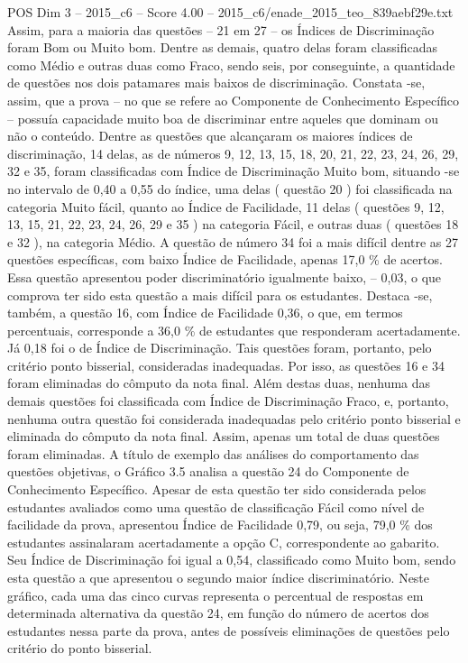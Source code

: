\begin{textsample}{POS Dim 3 – 2015\_c6 – Score 4.00 – 2015\_c6/enade\_2015\_teo\_839aebf29e.txt}
Assim, para a maioria das questões – 21 em 27 – os Índices de Discriminação foram Bom ou Muito bom.
Dentre as demais, quatro delas foram classificadas como Médio e outras duas como Fraco, sendo seis, por conseguinte, a quantidade de questões nos dois patamares mais baixos de discriminação.
Constata -se, assim, que a prova – no que se refere ao Componente de Conhecimento Específico – possuía capacidade muito boa de discriminar entre aqueles que dominam ou não o conteúdo.
Dentre as questões que alcançaram os maiores índices de discriminação, 14 delas, as de números 9, 12, 13, 15, 18, 20, 21, 22, 23, 24, 26, 29, 32 e 35, foram classificadas com Índice de Discriminação Muito bom, situando -se no intervalo de 0,40 a 0,55 do índice, uma delas ( questão 20 ) foi classificada na categoria Muito fácil, quanto ao Índice de Facilidade, 11 delas ( questões 9, 12, 13, 15, 21, 22, 23, 24, 26, 29 e 35 ) na categoria Fácil, e outras duas ( questões 18 e 32 ), na categoria Médio.
A questão de número 34 foi a mais difícil dentre as 27 questões específicas, com baixo Índice de Facilidade, apenas 17,0 \% de acertos.
Essa questão apresentou poder discriminatório igualmente baixo, – 0,03, o que comprova ter sido esta questão a mais difícil para os estudantes.
Destaca -se, também, a questão 16, com Índice de Facilidade 0,36, o que, em termos percentuais, corresponde a 36,0 \% de estudantes que responderam acertadamente.
Já 0,18 foi o de Índice de Discriminação.
Tais questões foram, portanto, pelo critério ponto bisserial, consideradas inadequadas.
Por isso, as questões 16 e 34 foram eliminadas do cômputo da nota final.
Além destas duas, nenhuma das demais questões foi classificada com Índice de Discriminação Fraco, e, portanto, nenhuma outra questão foi considerada inadequadas pelo critério ponto bisserial e eliminada do cômputo da nota final.
Assim, apenas um total de duas questões foram eliminadas.
A título de exemplo das análises do comportamento das questões objetivas, o Gráfico 3.5 analisa a questão 24 do Componente de Conhecimento Específico.
Apesar de esta questão ter sido considerada pelos estudantes avaliados como uma questão de classificação Fácil como nível de facilidade da prova, apresentou Índice de Facilidade 0,79, ou seja, 79,0 \% dos estudantes assinalaram acertadamente a opção C, correspondente ao gabarito.
Seu Índice de Discriminação foi igual a 0,54, classificado como Muito bom, sendo esta questão a que apresentou o segundo maior índice discriminatório.
Neste gráfico, cada uma das cinco curvas representa o percentual de respostas em determinada alternativa da questão 24, em função do número de acertos dos estudantes nessa parte da prova, antes de possíveis eliminações de questões pelo critério do ponto bisserial.

\end{textsample}

